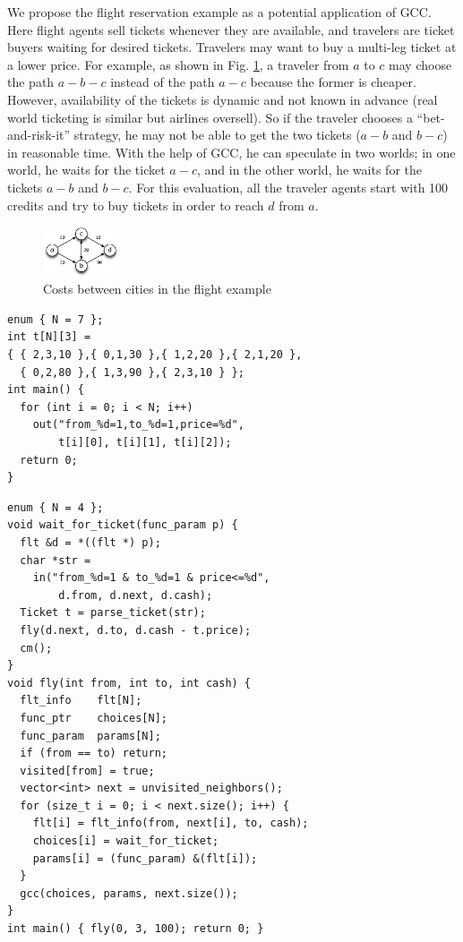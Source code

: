 \documentclass[preprint,10pt]{sigplanconf}
\begin{document}
We propose the flight reservation example as a potential application of GCC. 
Here flight agents sell tickets whenever they are available, and 
travelers are ticket buyers waiting for desired tickets. 
Travelers may want to buy a multi-leg ticket at a lower price. 
For example, as shown in Fig. \ref{fig:costs}, 
a traveler from $a$ to $c$ may choose the path $a-b-c$ instead of 
the path $a-c$ because the former is cheaper. 
However, availability of the tickets is dynamic and not known in advance
(real world ticketing is similar but airlines oversell).
So if the traveler chooses a ``bet-and-risk-it'' strategy, 
he may not be able to get the two tickets ($a-b$ and $b-c$) 
in reasonable time. 
With the help of GCC, he can speculate in two worlds; 
in one world, he waits for the ticket $a-c$, 
and in the other world, he waits for the tickets $a-b$ and $b-c$. 
For this evaluation, all the traveler agents start with 100 credits
and try to buy tickets in order to reach $d$ from $a$. 

\begin{figure}[h]
  \centering
  \includegraphics[width=0.2\textwidth]{eps/flight-costs}
  \vspace{-3mm}
  \caption{Costs between cities in the flight example}
  \label{fig:costs}
\end{figure}
\vspace*{-0.2cm}

\begin{lstlisting}[label=seller-cc,caption=Ticket seller's agent]
enum { N = 7 };
int t[N][3] =
{ { 2,3,10 },{ 0,1,30 },{ 1,2,20 },{ 2,1,20 },
  { 0,2,80 },{ 1,3,90 },{ 2,3,10 } };
int main() {
  for (int i = 0; i < N; i++)
    out("from_%d=1,to_%d=1,price=%d",
        t[i][0], t[i][1], t[i][2]);
  return 0;
}
\end{lstlisting}
\vspace*{-0.5cm}

\begin{lstlisting}[label=buyer-cc,caption=Ticket buyer's agent]
enum { N = 4 };
void wait_for_ticket(func_param p) {
  flt &d = *((flt *) p);
  char *str =
    in("from_%d=1 & to_%d=1 & price<=%d",
        d.from, d.next, d.cash);
  Ticket t = parse_ticket(str);
  fly(d.next, d.to, d.cash - t.price);
  cm();
}
void fly(int from, int to, int cash) {
  flt_info    flt[N];
  func_ptr    choices[N];
  func_param  params[N];
  if (from == to) return;
  visited[from] = true;
  vector<int> next = unvisited_neighbors();
  for (size_t i = 0; i < next.size(); i++) {
    flt[i] = flt_info(from, next[i], to, cash);
    choices[i] = wait_for_ticket;
    params[i] = (func_param) &(flt[i]);
  }
  gcc(choices, params, next.size());
}
int main() { fly(0, 3, 100); return 0; }
\end{lstlisting}
\end{document}

